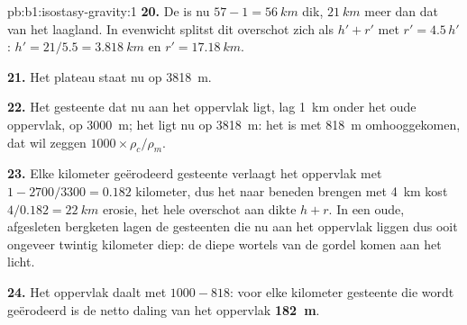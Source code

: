 \begin{solution}{pb:b1:isostasy-gravity:1}
\textbf{20.} De  is nu $57 - 1 = \qty{56}{km}$ dik, $\qty{21}{km}$ meer dan dat van het laagland. In evenwicht splitst dit overschot zich als $h' + r'$ met $r' = 4.5\,h'$: $h' = 21/5.5 = \qty{3.818}{km}$ en $r' = \qty{17.18}{km}$.

\textbf{21.} Het plateau staat nu op \qty{3818}{m}.

\textbf{22.} Het gesteente dat nu aan het oppervlak ligt, lag \qty{1}{km} onder het oude oppervlak, op \qty{3000}{m}; het ligt nu op \qty{3818}{m}: het is met \qty{818}{m} omhooggekomen, dat wil zeggen $1000\times\rho_c/\rho_m$.

\textbf{23.} Elke kilometer geërodeerd gesteente verlaagt het oppervlak met $1 - 2700/3300 =
0.182$ kilometer, dus het naar beneden brengen met \qty{4}{km} kost $4/0.182 = \qty{22}{km}$ erosie, het hele overschot aan dikte $h + r$. In een oude, afgesleten bergketen lagen de gesteenten die nu aan het oppervlak liggen dus ooit ongeveer twintig kilometer diep: de diepe wortels van de gordel komen aan het licht.

\textbf{24.} Het oppervlak daalt met $1000 - 818$: voor elke kilometer gesteente die wordt geërodeerd is de netto daling van het oppervlak
\textbf{\qty[text-series-to-math=true]{182}{m}}.
\end{solution}
